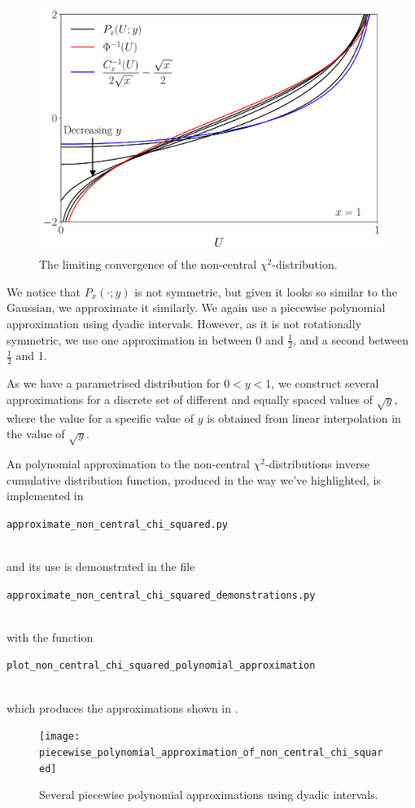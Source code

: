 \documentclass[11pt,a4paper,twoside,english]{extarticle}
\newcommand{\singlecodeline}[1]{\\[1em]\centerline{\lstinline[basicstyle=\ttfamily]$#1$}\\[1em]}
\begin{document}
\begin{figure}[h!tb]
\centering
\includegraphics[width=0.7\linewidth]{cir_update_factor_convergence_to_gaussian_both_limits}
\caption{The limiting convergence of the non-central $ \chi^2 $-distribution.}
\label{fig:cir_update_factor_convergence_to_gaussian_both_limits}
\end{figure}

We notice that $ P_x(\cdot;y) $ is not symmetric, but given it looks so similar to the Gaussian, we approximate it similarly. We again use a piecewise polynomial approximation using dyadic intervals. However, as it is not rotationally symmetric, we use one approximation in between 0 and $ \tfrac{1}{2} $, and a second between $ \tfrac{1}{2} $ and 1. 

As we have a parametrised distribution for $ 0 < y < 1 $, we construct several approximations for a discrete set of different and equally spaced values of $ \sqrt{y} $, where the value for a specific value of $ y $ is obtained from linear interpolation in the value of $ \sqrt{y} $. 

An polynomial approximation to the non-central $ \chi^2 $-distributions inverse cumulative distribution function, produced in the way we've highlighted, is implemented in \singlecodeline{approximate_non_central_chi_squared.py}
and its use is demonstrated in the file \singlecodeline{approximate_non_central_chi_squared_demonstrations.py} with the function \singlecodeline{plot_non_central_chi_squared_polynomial_approximation}
which produces the approximations shown in .

\begin{figure}[htb]
\centering
\texttt{[image: piecewise\_polynomial\_approximation\_of\_non\_central\_chi\_squared]}
\caption{Several piecewise polynomial approximations using dyadic intervals.}
\label{fig:piecewise_polynomial_approximation_of_non_central_chi_squared}
\end{figure}
\end{document}

